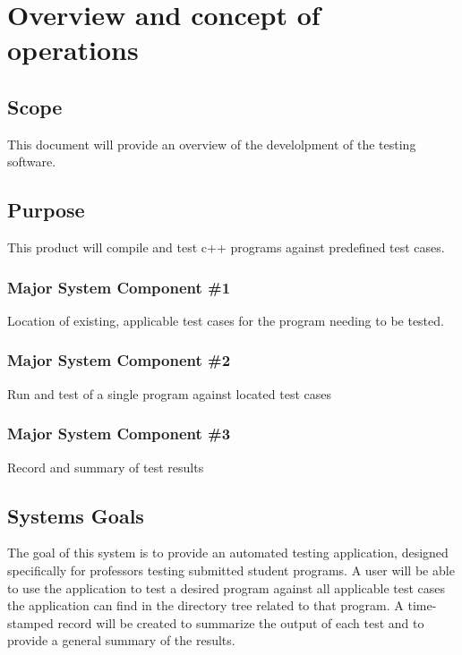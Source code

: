 
\chapter{Overview and concept of operations}


\section{Scope}
This document will provide an overview of the develolpment of the testing software.


\section{Purpose}
This product will compile and test c++ programs against predefined test cases.


\subsection{Major System Component \#1}
Location of existing, applicable test cases for the program needing to be tested.

\subsection{Major System Component \#2}
Run and test of a single program against located test cases

\subsection{Major System Component \#3}
Record and summary of test results

\section{Systems Goals}
The goal of this system is to provide an automated testing application, designed specifically
for professors testing submitted student programs. A user will be able to use the application
to test a desired program against all applicable test cases the application can find in the directory tree 
related to that program.  A time-stamped record will be created to summarize the output of each test and to provide a
general summary of the results. 

